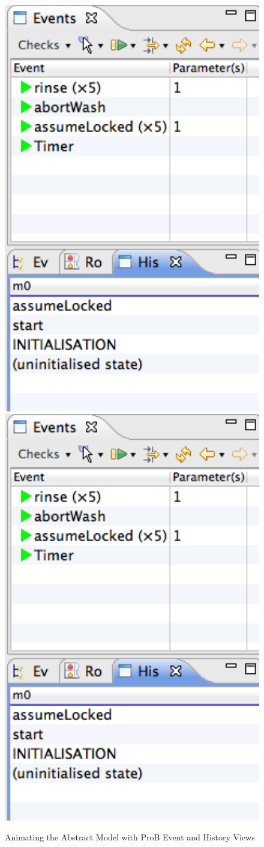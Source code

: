  \begin{figure}[!htbp]
  \centering
  \ifplastex
  \includegraphics[width=1024]{figures/image16.png}
  \else
  \includegraphics[width=1\textwidth]{figures/image16.png}
  \fi
  \caption{Animating the Abstract Model with ProB Event and History Views}
  \label{fig:AnimatingTheAbstractModelWithProBEventAndHistoryViews}
\end{figure} 

